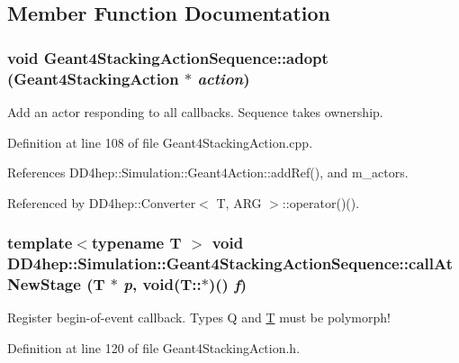 \subsection{Member Function Documentation}
\hypertarget{class_d_d4hep_1_1_simulation_1_1_geant4_stacking_action_sequence_a19b6f7d514d79b40c490226a361d55b4}{
\subsubsection[{adopt}]{\setlength{\rightskip}{0pt plus 5cm}void Geant4StackingActionSequence::adopt ({\bf Geant4StackingAction} $\ast$ {\em action})}}
\label{class_d_d4hep_1_1_simulation_1_1_geant4_stacking_action_sequence_a19b6f7d514d79b40c490226a361d55b4}


Add an actor responding to all callbacks. Sequence takes ownership. 

Definition at line 108 of file Geant4StackingAction.cpp.

References DD4hep::Simulation::Geant4Action::addRef(), and m\_\-actors.

Referenced by DD4hep::Converter$<$ T, ARG $>$::operator()().\hypertarget{class_d_d4hep_1_1_simulation_1_1_geant4_stacking_action_sequence_a653b407655119e1d390d1297da1100c2}{
\subsubsection[{callAtNewStage}]{\setlength{\rightskip}{0pt plus 5cm}template$<$typename T $>$ void DD4hep::Simulation::Geant4StackingActionSequence::callAtNewStage ({\bf T} $\ast$ {\em p}, \/  void(T::$\ast$)() {\em f})}}
\label{class_d_d4hep_1_1_simulation_1_1_geant4_stacking_action_sequence_a653b407655119e1d390d1297da1100c2}


Register begin-\/of-\/event callback. Types Q and \hyperlink{class_t}{T} must be polymorph! 

Definition at line 120 of file Geant4StackingAction.h.

